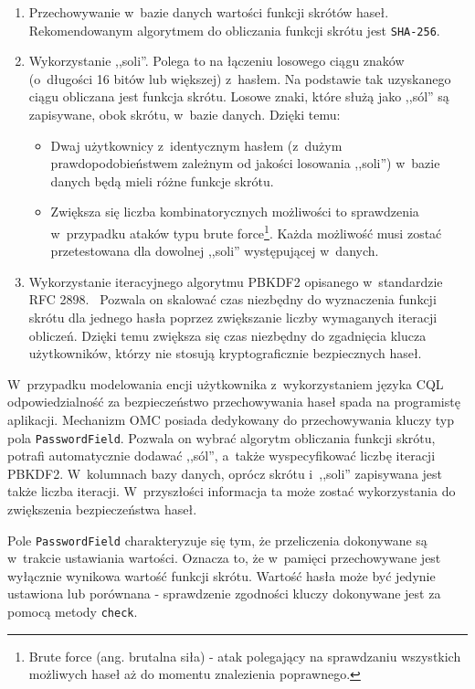 \begin{enumerate}
	\item Przechowywanie w~bazie danych wartości funkcji skrótów haseł. Rekomendowanym algorytmem do obliczania funkcji skrótu jest \verb+SHA-256+.
	\item Wykorzystanie ,,soli''. Polega to na łączeniu losowego ciągu znaków (o~długości 16 bitów lub większej) z~hasłem. Na podstawie tak uzyskanego ciągu obliczana jest funkcja skrótu. Losowe znaki, które służą jako ,,sól'' są zapisywane, obok skrótu, w~bazie danych. Dzięki temu:
		\begin{itemize}
			\item Dwaj użytkownicy z~identycznym hasłem (z~dużym prawdopodobieństwem zależnym od jakości losowania ,,soli'') w~bazie danych będą mieli różne funkcje skrótu.
			\item Zwiększa się liczba kombinatorycznych możliwości to sprawdzenia w~przypadku ataków typu brute force\footnote{Brute force (ang. brutalna siła) - atak polegający na sprawdzaniu wszystkich możliwych haseł aż do momentu znalezienia poprawnego.}. Każda możliwość musi zostać przetestowana dla dowolnej ,,soli'' występującej w~danych.
		\end{itemize}
	\item Wykorzystanie iteracyjnego algorytmu PBKDF2 opisanego w~standardzie RFC 2898.~\cite{rfc_2898} Pozwala on skalować czas niezbędny do wyznaczenia funkcji skrótu dla jednego hasła poprzez zwiększanie liczby wymaganych iteracji obliczeń. Dzięki temu zwiększa się czas niezbędny do zgadnięcia klucza użytkowników, którzy nie stosują kryptograficznie bezpiecznych haseł.
\end{enumerate}

W~przypadku modelowania encji użytkownika z~wykorzystaniem języka CQL odpowiedzialność za bezpieczeństwo przechowywania haseł spada na programistę aplikacji. Mechanizm OMC posiada dedykowany do przechowywania kluczy typ pola \verb+PasswordField+. Pozwala on wybrać algorytm obliczania funkcji skrótu, potrafi automatycznie dodawać ,,sól'', a~także wyspecyfikować liczbę iteracji PBKDF2. W~kolumnach bazy danych, oprócz skrótu i~,,soli'' zapisywana jest także liczba iteracji. W~przyszłości informacja ta może zostać wykorzystania do zwiększenia bezpieczeństwa haseł.

Pole \verb+PasswordField+ charakteryzuje się tym, że przeliczenia dokonywane są w~trakcie ustawiania wartości. Oznacza to, że w~pamięci przechowywane jest wyłącznie wynikowa wartość funkcji skrótu. Wartość hasła może być jedynie ustawiona lub porównana - sprawdzenie zgodności kluczy dokonywane jest za pomocą metody \verb+check+.

